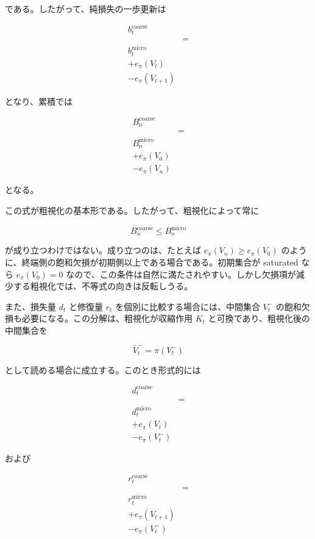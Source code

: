 \documentclass[12pt,a4paper]{article}
\begin{document}
である。したがって、純損失の一歩更新は

\[
\begin{aligned}
b_{t}^{\mathrm{coarse}} \\
&= \\
b_{t}^{\mathrm{micro}} \\
+ e_\pi(V_{t}) \\
- e_\pi(V_{t+1})
\end{aligned}
\]

となり、累積では

\[
\begin{aligned}
B_{n}^{\mathrm{coarse}} \\
&= \\
B_{n}^{\mathrm{micro}} \\
+ e_\pi(V_0) \\
- e_\pi(V_{n})
\end{aligned}
\]

となる。

この式が粗視化の基本形である。したがって、粗視化によって常に

\[
B_{n}^{\mathrm{coarse}} \le B_{n}^{\mathrm{micro}}
\]

が成り立つわけではない。成り立つのは、たとえば \(e_\pi(V_{n})\ge e_\pi(V_0)\) のように、終端側の飽和欠損が初期側以上である場合である。初期集合が saturated なら \(e_\pi(V_0)=0\) なので、この条件は自然に満たされやすい。しかし欠損項が減少する粗視化では、不等式の向きは反転しうる。

また、損失量 \(d_{t}\) と修復量 \(r_{t}\) を個別に比較する場合には、中間集合 \(V_{t}^-\) の飽和欠損も必要になる。この分解は、粗視化が収縮作用 \(K_{t}\) と可換であり、粗視化後の中間集合を

\[
\bar V_{t}^-=\pi(V_{t}^-)
\]

として読める場合に成立する。このとき形式的には

\[
\begin{aligned}
d_{t}^{\mathrm{coarse}} \\
&= \\
d_{t}^{\mathrm{micro}} \\
+ e_\pi(V_{t}) \\
- e_\pi(V_{t}^-)
\end{aligned}
\]

および

\[
\begin{aligned}
r_{t}^{\mathrm{coarse}} \\
&= \\
r_{t}^{\mathrm{micro}} \\
+ e_\pi(V_{t+1}) \\
- e_\pi(V_{t}^-)
\end{aligned}
\]
\end{document}
